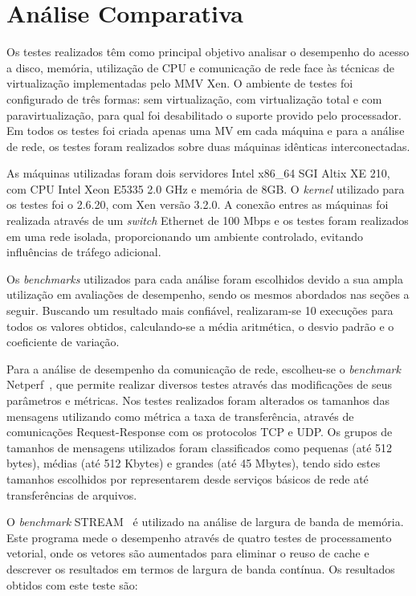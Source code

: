 \documentclass[times, 10pt,twocolumn]{article}
\def\kernel{\textit{kernel}\xspace}
\begin{document}
\section{Análise Comparativa}\label{s:analise}
Os testes realizados têm como principal objetivo analisar o desempenho do acesso a 
disco, memória, utilização de CPU e comunicação de rede face às técnicas de 
virtualização implementadas pelo MMV Xen. O ambiente de testes foi configurado de 
três formas: sem virtualização, com virtualização total e com paravirtualização, para 
qual foi desabilitado o suporte provido pelo processador. Em todos os testes foi 
criada apenas uma MV em cada máquina e para a análise de rede, os testes foram 
realizados sobre duas máquinas idênticas interconectadas.

As máquinas utilizadas foram dois servidores Intel x86\_64 SGI Altix XE 210, com CPU
Intel Xeon E5335 2.0 GHz e memória de 8GB. O \kernel utilizado para os testes foi 
o 2.6.20, com Xen versão 3.2.0. A conexão entres as máquinas  foi realizada através
de um \textit{switch} Ethernet de 100 Mbps e os testes foram realizados em uma rede
isolada, proporcionando um ambiente controlado, evitando influências de tráfego 
adicional. 

Os \textit{benchmarks} utilizados para cada análise foram escolhidos devido a 
sua ampla utilização em avaliações de desempenho, sendo os mesmos abordados nas 
seções a seguir. Buscando um resultado mais confiável, realizaram-se 10 execuções
para todos os valores obtidos, calculando-se a média aritmética, 
o desvio padrão e o coeficiente de variação. 

Para a análise de desempenho da comunicação de rede, escolheu-se o \textit{benchmark}
Netperf~\cite{netperf}, que permite realizar diversos testes através das modificações 
de seus parâmetros e métricas. Nos testes realizados foram alterados os tamanhos das
mensagens utilizando como métrica a taxa de transferência, através de comunicações
Request-Response com os protocolos TCP e UDP. Os grupos de tamanhos de mensagens 
utilizados foram classificados como pequenas (até 512 bytes), médias (até 512 Kbytes) 
e grandes (até 45 Mbytes), tendo sido estes tamanhos escolhidos por representarem 
desde serviços básicos de rede até transferências de arquivos.

O \textit{benchmark} STREAM~\cite{stream} é utilizado na análise de largura de banda 
de memória. Este programa mede o desempenho através de quatro testes de 
processamento vetorial, onde os vetores são aumentados para eliminar o reuso de cache
e descrever os resultados em termos de largura de banda contínua. Os resultados 
obtidos com este teste são:
\end{document}
